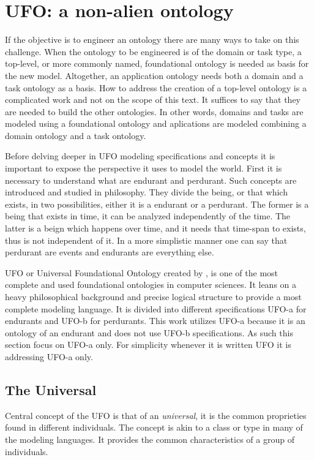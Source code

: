 \section{UFO: a non-alien ontology} 

If the objective is to engineer an ontology there are many ways to take on this challenge. When the ontology to be engineered is of the domain or task type, a top-level, or more commonly named, foundational ontology is needed as basis for the new model. Altogether, an application ontology needs both a domain and a task ontology as a basis. How to address the creation of a top-level ontology is a complicated work and not on the scope of this text. It suffices to say that they are needed to build the other ontologies. In other words, domains and tasks are modeled using a foundational ontology and aplications are modeled combining a domain ontology and a task ontology.

Before delving deeper in UFO modeling specifications and concepts it is important to expose the perspective it uses to model the world. First it is necessary to understand what are endurant and perdurant. Such concepts are introduced and studied in philosophy. They divide the being, or that which exists, in two possibilities, either it is a endurant or a perdurant. The former is a being that exists in time, it can be analyzed independently of the time. The latter is a beign which happens over time, and it needs that time-span to exists, thus is not independent of it. In a more simplistic manner one can say that perdurant are events and endurants are everything else. 

UFO or Universal Foundational Ontology created by \cite{guizzardi_ontological_2005}, is one of the most complete and used foundational ontologies in computer sciences. It leans on a heavy philosophical background and precise logical structure to provide a most complete modeling language. It is divided into different specifications UFO-a for endurants and UFO-b for perdurants. This work utilizes UFO-a because it is an ontology of an endurant and does not use UFO-b specifications. As such this section focus on UFO-a only. For simplicity whenever it is written UFO it is addressing UFO-a only.

\subsection{The Universal}

Central concept of the UFO is that of an \textit{universal}, it is the common proprieties found in different individuals. The concept is akin to a class or type in many of the modeling languages. It provides the common characteristics of a group of individuals. 

